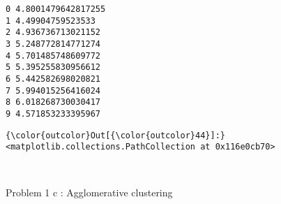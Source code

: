 \documentclass[11pt]{article}
\begin{document}
    \begin{Verbatim}[commandchars=\\\{\}]
0 4.8001479642817255
1 4.49904759523533
2 4.936736713021152
3 5.248772814771274
4 5.701485748609772
5 5.395255830956612
6 5.442582698020821
7 5.994015256416024
8 6.018268730030417
9 4.571853233395967

    \end{Verbatim}

\begin{Verbatim}[commandchars=\\\{\}]
{\color{outcolor}Out[{\color{outcolor}44}]:} <matplotlib.collections.PathCollection at 0x116e0cb70>
\end{Verbatim}
            
    \begin{center}
    \end{center}
    { \hspace*{\fill} \\}
    
    Problem 1 c : Agglomerative clustering
\end{document}
